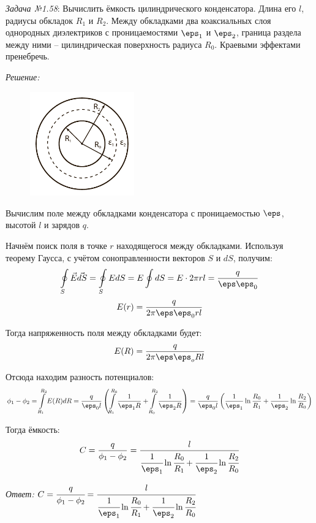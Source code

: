 \newpage

\emph{Задача №1.58}: Вычислить ёмкость цилиндрического конденсатора. Длина 
его \( l \), радиусы обкладок \( R_1 \) и \( R_2 \). Между обкладками два 
коаксиальных слоя однородных диэлектриков с проницаемостями \( \eps_1 \) 
и \( \eps_2 \), граница раздела между ними -- цилиндрическая поверхность 
радиуса \( R_0 \). Краевыми эффектами пренебречь.

\emph{Решение:}

\begin{figure}
	\vspace{-2ex}
	\includegraphics[width=0.4\textwidth]{pdf/image_1_58}
\end{figure}

Вычислим поле между обкладками конденсатора с проницаемостью \( \eps \), 
высотой \( l \) и зарядов \( q \). 

Начнём поиск поля в точке \( r \) находящегося между обкладками. Используя 
теорему Гаусса, с учётом соноправленности векторов \( S \) и 
\( dS \), получим:
\[ 
	\oint\limits_S \vec{E}\vec{dS} = \oint\limits_S EdS = 
	E \oint dS = E \cdot 2\pi r l = \frac{q}{\eps\eps_0}
\]
\[
	E(r) = \frac{q}{2\pi\eps\eps_0 rl}
\]

Тогда напряженность поля между обкладками будет:
\[
	E(R) = \frac{q}{2\pi\eps\eps_o Rl}
\]

Отсюда находим разность потенциалов:
\[
	\phi_1 - \phi_2 = \int\limits^{R_2}_{R_1} E(R) dR = 
	\frac{q}{\eps_0 l} \left( 
		\int \limits^{R_0}_{R_1} \frac{1}{\eps_1 R} + 
		\int \limits^{R_2}_{R_0} \frac{1}{\eps_2 R} 
	\right) = 
	\frac{q}{\eps_0 l} \left(
		\frac{1}{\eps_1}\ln\frac{R_0}{R_1} + 
		\frac{1}{\eps_2}\ln\frac{R_2}{R_0}
	\right) 
\]

Тогда ёмкость:
\[
	C = \frac{q}{\phi_1 - \phi_2} = 
	\frac{l}{ \cfrac{1}{\eps_1}\ln\cfrac{R_0}{R_1} + 
	\cfrac{1}{\eps_2}\ln\cfrac{R_2}{R_0}}
\]

\emph{Ответ:} \(
	C = \cfrac{q}{\phi_1 - \phi_2} = 
	\cfrac{l}{ \cfrac{1}{\eps_1}\ln\cfrac{R_0}{R_1} + 
	\cfrac{1}{\eps_2}\ln\cfrac{R_2}{R_0}}
\)

